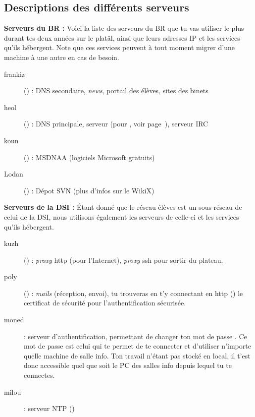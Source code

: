 \subsection{Descriptions des différents serveurs}
{\bf Serveurs du BR :} Voici la liste des serveurs du BR que tu vas
utiliser le plus durant tes deux années sur le platâl, ainsi que
leurs adresses IP et les services qu'ils hébergent. Note que ces services
peuvent à tout moment migrer d'une machine à une autre en cas de
besoin.


\begin{description}
        \item[frankiz] () : DNS secondaire,
        \emph{news}, portail des élèves, sites des binets
        \item[heol] () : DNS principale,
        serveur  (pour , voir page~\pageref{qrezix}), serveur IRC
    \item[koun] () : MSDNAA (logiciels Microsoft gratuits)
    \item[Lodan] () : D\'epot SVN (plus d'infos sur le WikiX)
\end {description}

{\bf Serveurs de la DSI : } \'Etant donné que le réseau élèves est un
sous-réseau de celui de la DSI, nous utilisons également les
serveurs de celle-ci et les services qu'ils hébergent.

\begin{description}
        \item[kuzh] () : \emph{proxy} http (pour l'Internet), \emph{proxy} ssh pour sortir du plateau.
        \item[poly] () : \emph{mails} (réception, envoi), tu trouveras en t'y connectant en http () le certificat de sécurité pour l'authentification sécurisée.
        \item[moned] : serveur d'authentification, permettant de
        changer ton mot de passe . Ce mot de passe est celui qui
        te permet de te connecter et d'utiliser n'importe
        quelle machine de salle info. Ton travail n'étant pas stocké
        en local, il t'est donc accessible quel que soit le PC des salles info depuis
        lequel tu te connectes.
    \item[milou] : serveur NTP ()
\end {description}

